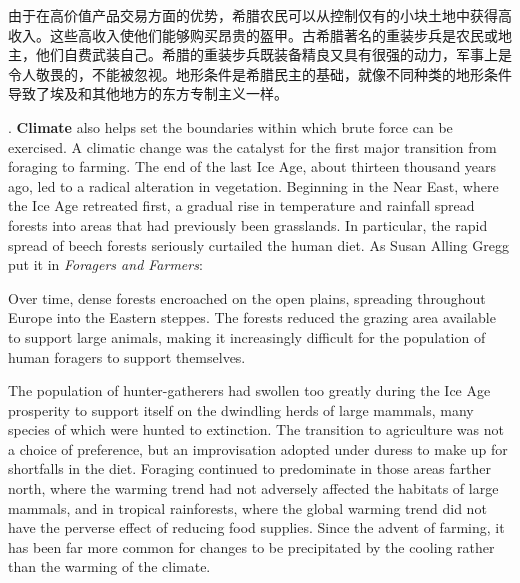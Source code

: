 \begin{paracol}{2}
由于在高价值产品交易方面的优势，希腊农民可以从控制仅有的小块土地中获得高收入。这些高收入使他们能够购买昂贵的盔甲。古希腊著名的重装步兵是农民或地主，他们自费武装自己。希腊的重装步兵既装备精良又具有很强的动力，军事上是令人敬畏的，不能被忽视。地形条件是希腊民主的基础，就像不同种类的地形条件导致了埃及和其他地方的东方专制主义一样。

. \textbf{Climate} also helps set the boundaries within which brute force can be exercised. A climatic change was the catalyst for the first major transition from foraging to farming. The end of the last Ice Age, about thirteen thousand years ago, led to a radical alteration in vegetation. Beginning in the Near East, where the Ice Age retreated first, a gradual rise in temperature and rainfall spread forests into areas that had previously been grasslands. In particular, the rapid spread of beech forests seriously curtailed the human diet. As Susan Alling Gregg put it in \emph{Foragers and Farmers}:


Over time, dense forests encroached on the open plains, spreading throughout Europe into the Eastern steppes. The forests reduced the grazing area available to support large animals, making it increasingly difficult for the population of human foragers to support themselves.

The population of hunter-gatherers had swollen too greatly during the Ice Age prosperity to support itself on the dwindling herds of large mammals, many species of which were hunted to extinction. The transition to agriculture was not a choice of preference, but an improvisation adopted under duress to make up for shortfalls in the diet. Foraging continued to predominate in those areas farther north, where the warming trend had not adversely affected the habitats of large mammals, and in tropical rainforests, where the global warming trend did not have the perverse effect of reducing food supplies. Since the advent of farming, it has been far more common for changes to be precipitated by the cooling rather than the warming of the climate.


\end{paracol}
